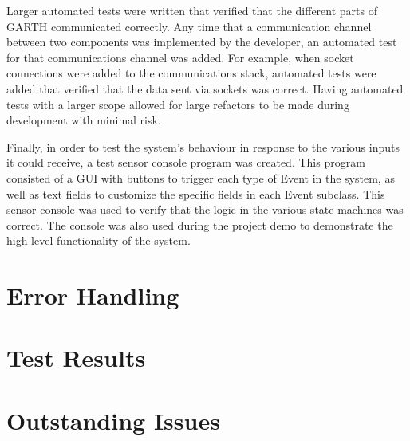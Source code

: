 \documentclass{article}
\begin{document}
Larger automated tests were written that verified that the different
parts of GARTH communicated correctly. Any time that a communication
channel between two components was implemented by the developer, an
automated test for that communications channel was added. For example,
when socket connections were added to the communications stack,
automated tests were added that verified that the data sent via
sockets was correct. Having automated tests with a larger scope
allowed for large refactors to be made during development with minimal
risk.

Finally, in order to test the system's behaviour in response to the
various inputs it could receive, a test sensor console program was
created. This program consisted of a GUI with buttons to trigger each
type of Event in the system, as well as text fields to customize the
specific fields in each Event subclass. This sensor console was used
to verify that the logic in the various state machines was
correct. The console was also used during the project demo to
demonstrate the high level functionality of the system.

\section{Error Handling} 

\section{Test Results}

\section{Outstanding Issues} %
\end{document}
